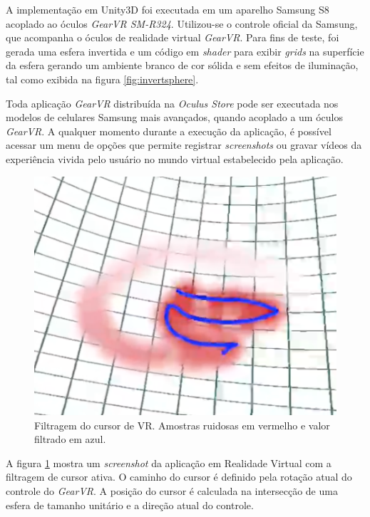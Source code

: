 \documentclass[conference]{IEEEtran}
\begin{document}
A implementação em Unity3D foi executada em um aparelho Samsung S8 acoplado ao óculos \textit{GearVR SM-R324}. Utilizou-se o controle oficial da Samsung, que acompanha o óculos de realidade virtual \textit{GearVR}. Para fins de teste, foi gerada uma esfera invertida e um código em \textit{shader} para exibir \textit{grids} na superfície da esfera gerando um ambiente branco de cor sólida e sem efeitos de iluminação, tal como exibida na figura \ref{fig:invertsphere}.

Toda aplicação \textit{GearVR} distribuída na \textit{Oculus Store} \cite{gearvrstore} pode ser executada nos modelos de celulares Samsung mais avançados, quando acoplado a um óculos \textit{GearVR}. A qualquer momento durante a execução da aplicação, é possível acessar um menu de opções que permite registrar \textit{screenshots} ou gravar vídeos da experiência vivida pelo usuário no mundo virtual estabelecido pela aplicação.

\begin{figure}[h!]
\centering
\includegraphics[width=\linewidth]{images/image_01.png}
\caption{Filtragem do cursor de VR. Amostras ruidosas em vermelho e valor filtrado em azul.}
\label{fig:filter01}
\end{figure}

A figura \ref{fig:filter01} mostra um \textit{screenshot} da aplicação em Realidade Virtual com a filtragem de cursor ativa. O caminho do cursor é definido pela rotação atual do controle do \textit{GearVR}. A posição do cursor é calculada na intersecção de uma esfera de tamanho unitário e a direção atual do controle.
\end{document}
